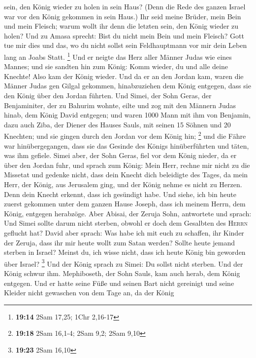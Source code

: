 sein, den König wieder zu holen in sein Haus? (Denn die Rede des ganzen
Israel war vor den König gekommen in sein Haus.)  Ihr
seid meine Brüder, mein Bein und mein Fleisch; warum wollt ihr denn die
letzten sein, den König wieder zu holen?  Und zu Amasa
sprecht: Bist du nicht mein Bein und mein Fleisch? Gott tue mir dies und
das, wo du nicht sollst sein Feldhauptmann vor mir dein Leben lang an
Joabs Statt. \footnote{\textbf{19:14} 2Sam 17,25; 1Chr 2,16-17}
 Und er neigte das Herz aller Männer Judas wie eines
Mannes; und sie sandten hin zum König: Komm wieder, du und alle deine
Knechte!  Also kam der König wieder. Und da er an den
Jordan kam, waren die Männer Judas gen Gilgal gekommen, hinabzuziehen
dem König entgegen, dass sie den König über den Jordan führten.
 Und Simei, der Sohn Geras, der Benjaminiter, der zu
Bahurim wohnte, eilte und zog mit den Männern Judas hinab, dem König
David entgegen;  und waren 1000 Mann mit ihm von
Benjamin, dazu auch Ziba, der Diener des Hauses Sauls, mit seinen 15
Söhnen und 20 Knechten; und sie gingen durch den Jordan vor dem König
hin; \footnote{\textbf{19:18} 2Sam 16,1-4; 2Sam 9,2; 2Sam 9,10}
 und die Fähre war hinübergegangen, dass sie das Gesinde
des Königs hinüberführten und täten, was ihm gefiele. Simei aber, der
Sohn Geras, fiel vor dem König nieder, da er über den Jordan fuhr,
 und sprach zum König: Mein Herr, rechne mir nicht zu die
Missetat und gedenke nicht, dass dein Knecht dich beleidigte des Tages,
da mein Herr, der König, aus Jerusalem ging, und der König nehme es
nicht zu Herzen.  Denn dein Knecht erkennt, dass ich
gesündigt habe. Und siehe, ich bin heute zuerst gekommen unter dem
ganzen Hause Joseph, dass ich meinem Herrn, dem König, entgegen
herabzöge.  Aber Abisai, der Zeruja Sohn, antwortete und
sprach: Und Simei sollte darum nicht sterben, obwohl er doch dem
Gesalbten des \textsc{Herrn} geflucht hat?  David aber
sprach: Was habe ich mit euch zu schaffen, ihr Kinder der Zeruja, dass
ihr mir heute wollt zum Satan werden? Sollte heute jemand sterben in
Israel? Meinst du, ich wisse nicht, dass ich heute König bin geworden
über Israel? \footnote{\textbf{19:23} 2Sam 16,10}  Und
der König sprach zu Simei: Du sollst nicht sterben. Und der König schwur
ihm.  Mephiboseth, der Sohn Sauls, kam auch herab, dem
König entgegen. Und er hatte seine Füße und seinen Bart nicht gereinigt
und seine Kleider nicht gewaschen von dem Tage an, da der König

